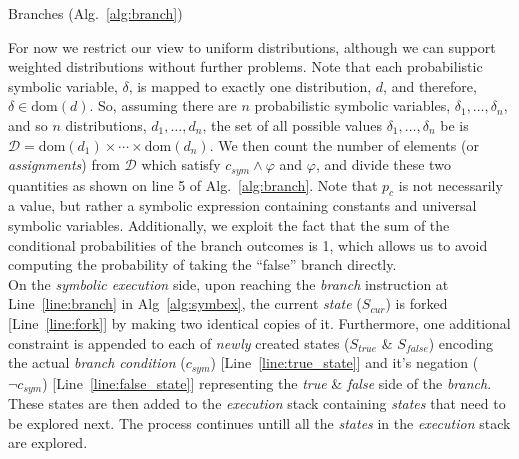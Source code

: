 \documentclass[acmsmall,review]{acmart}\settopmatter{}
\newcommand*\dom[1]{\mathrm{dom}\left( #1 \right)}
\begin{document}
\begin{paragraph}{Branches (Alg.~\ref{alg:branch})}
		
		For now we restrict our view to uniform distributions, although we can support weighted distributions without further problems.
		Note that each probabilistic symbolic variable, $\delta$, is mapped to exactly one distribution, $d$, and therefore, $\delta \in \dom{d}$.
		So, assuming there are $n$ probabilistic symbolic variables, $\delta_1,\ldots,\delta_n$, and so $n$ distributions, $d_1,\ldots,d_n$, the set of all possible values $\delta_1,\ldots,\delta_n$ be is $\mathcal{D} = \dom{d_1} \times \cdots \times \dom{d_n}$.
		We then count the number of elements (or \textit{assignments}) from $\mathcal{D}$ which satisfy $c_{sym} \wedge \varphi$ and $\varphi$, and divide these two quantities as shown on line 5 of Alg.~\ref{alg:branch}.
		Note that $p_c$ is not necessarily a value, but rather a symbolic expression containing constants and universal symbolic variables.
		Additionally, we exploit the fact that the sum of the conditional probabilities of the branch outcomes is 1, which allows us to avoid computing the probability of taking the ``false'' branch directly. \\
		On the \textit{symbolic execution} side, upon reaching the \textit{branch} instruction at Line~\ref{line:branch} in Alg~\ref{alg:symbex}, the current \textit{state} ($S_{cur}$) is forked [Line~\ref{line:fork}] by making two identical copies of it. Furthermore, one additional constraint is appended to each of \textit{newly} created states ($S_{true}$ \& $S_{false}$) encoding the actual \textit{branch condition} ($c_{sym}$) [Line~\ref{line:true_state}] and it's negation ($\neg c_{sym}$) [Line~\ref{line:false_state}] representing the \textit{true} \& \textit{false} side of the \textit{branch}. 
		These states are then added to the \textit{execution} stack containing \textit{states} that need to be explored next. The process continues untill all the \textit{states} in the \textit{execution} stack are explored.
	\end{paragraph}
	
\end{document}
